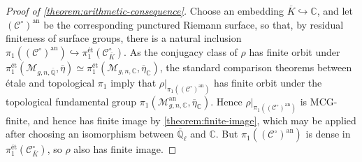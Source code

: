 \documentclass[12 pt]{amsart}
\theoremstyle{plain}
\theoremstyle{definition}
\theoremstyle{remark}
\numberwithin{equation}{section}
\begin{document}
\begin{proof}[Proof of \autoref{theorem:arithmetic-consequence}]
	Choose an embedding $\overline{K}\hookrightarrow\mathbb{C}$, and let
	$(\mathscr{C}^\circ)^{\text{an}}$ be the corresponding punctured Riemann
	surface, so that,
	by residual finiteness of surface groups,
	there is a natural inclusion
	$\pi_1((\mathscr{C}^\circ)^{\text{an}})\hookrightarrow
	\pi_1^{\text{\'et}}(\mathscr{C}^\circ_{\overline{K}})$. As the conjugacy
	class of $\rho$ has finite orbit under
	$\pi_1^{\text{\'et}}(\mathscr{M}_{g,n, \overline{\mathbb{Q}}},
	\overline{\eta})
	\simeq \pi_1^{\text{\'et}}(\mathscr{M}_{g,n, \mathbb{C}},
\overline{\eta}_{\mathbb C})$, the standard comparison theorems between \'etale and
	topological $\pi_1$
	\cite[Expos\'e XII, Corollaire 5.2]{sga1}
	imply that
	$\rho|_{\pi_1((\mathscr{C}^\circ)^{\text{an}})}$ has finite orbit under
	the topological fundamental group
	$\pi_1(\mathscr{M}_{g,n, \mathbb{C}}^{\text{an}},
	\overline{\eta}_{\mathbb{C}})$. Hence
	$\rho|_{\pi_1((\mathscr{C}^\circ)^{\text{an}})}$ is MCG-finite, and hence has
	finite image by \autoref{theorem:finite-image},
	which may be applied after choosing an isomorphism between $\overline{\mathbb{Q}}_\ell$ and $\mathbb{C}$. 
	But
	$\pi_1( (\mathscr{C}^\circ)^{\text{an}})$ is dense in
	$\pi_1^{\text{\'et}}(\mathscr{C}^\circ_{\overline{K}})$, so $\rho$ also
	has finite image.
%	

\end{proof}
\end{document}
